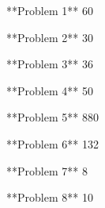 **Problem 1**
60

**Problem 2**
30

**Problem 3**
36

**Problem 4**
50

**Problem 5**
880

**Problem 6**
132

**Problem 7**
8

**Problem 8**
10
